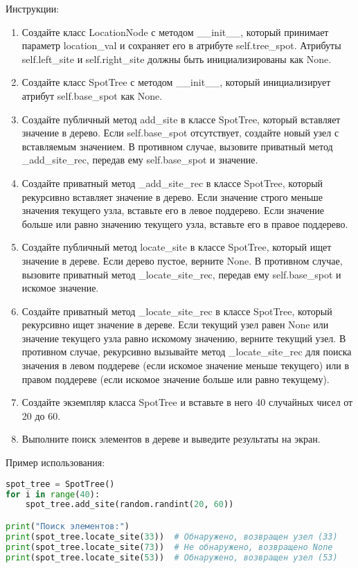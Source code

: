 \begin{enumerate}
Инструкции:
\begin{enumerate}
    \item Создайте класс LocationNode с методом \_\_init\_\_, который принимает параметр location\_val и сохраняет его в атрибуте self.tree\_spot. Атрибуты self.left\_site и self.right\_site должны быть инициализированы как None.
    \item Создайте класс SpotTree с методом \_\_init\_\_, который инициализирует атрибут self.base\_spot как None.
    \item Создайте публичный метод add\_site в классе SpotTree, который вставляет значение в дерево. Если self.base\_spot отсутствует, создайте новый узел с вставляемым значением. В противном случае, вызовите приватный метод \_add\_site\_rec, передав ему self.base\_spot и значение.
    \item Создайте приватный метод \_add\_site\_rec в классе SpotTree, который рекурсивно вставляет значение в дерево. Если значение строго меньше значения текущего узла, вставьте его в левое поддерево. Если значение больше или равно значению текущего узла, вставьте его в правое поддерево.
    \item Создайте публичный метод locate\_site в классе SpotTree, который ищет значение в дереве. Если дерево пустое, верните None. В противном случае, вызовите приватный метод \_locate\_site\_rec, передав ему self.base\_spot и искомое значение.
    \item Создайте приватный метод \_locate\_site\_rec в классе SpotTree, который рекурсивно ищет значение в дереве. Если текущий узел равен None или значение текущего узла равно искомому значению, верните текущий узел. В противном случае, рекурсивно вызывайте метод \_locate\_site\_rec для поиска значения в левом поддереве (если искомое значение меньше текущего) или в правом поддереве (если искомое значение больше или равно текущему).
    \item Создайте экземпляр класса SpotTree и вставьте в него 40 случайных чисел от 20 до 60.
    \item Выполните поиск элементов в дереве и выведите результаты на экран.
\end{enumerate}

Пример использования:
\begin{lstlisting}[language=Python]
spot_tree = SpotTree()
for i in range(40):
    spot_tree.add_site(random.randint(20, 60))

print("Поиск элементов:")
print(spot_tree.locate_site(33))  # Обнаружено, возвращен узел (33)
print(spot_tree.locate_site(73))  # Не обнаружено, возвращено None
print(spot_tree.locate_site(53))  # Обнаружено, возвращен узел (53)
\end{lstlisting}


\end{enumerate}
